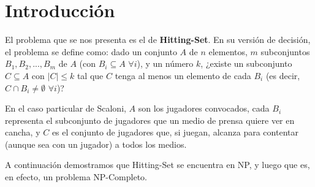 \section{Introducción}

El problema que se nos presenta es el de \textbf{Hitting-Set}. En su versión de decisión, el problema se define como: dado un
conjunto $A$ de $n$ elementos, $m$ subconjuntos $B_1, B_2, ..., B_m$ de $A$ (con $B_i \subseteq A$ $\forall i$), y un número
$k$, ¿existe un subconjunto $C \subseteq A$ con $|C| \leq k$ tal que $C$ tenga al menos un elemento de cada $B_i$ (es decir,
$C \cap B_i \neq \emptyset$ $\forall i$)?

En el caso particular de Scaloni, $A$ son los jugadores convocados, cada $B_i$ representa el subconjunto de jugadores que un
medio de prensa quiere ver en cancha, y $C$ es el conjunto de jugadores que, si juegan, alcanza para contentar (aunque sea con
un jugador) a todos los medios.

A continuación demostramos que Hitting-Set se encuentra en NP, y luego que es, en efecto, un problema NP-Completo.
